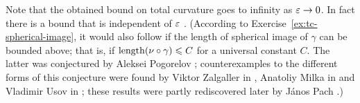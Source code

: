 Note that the obtained bound on total curvature goes to infinity as $\varepsilon\to 0$.
In fact there is a bound that is independent of $\varepsilon$ \cite{lebedeva-petrunin}.
(According to Exercise~\ref{ex:tc-spherical-image}, it would also follow if the length of spherical image of $\gamma$ can be bounded above; 
that is, if $\mathop{\rm length}\nolimits(\nu\circ\gamma)\leqslant C$ for a universal constant $C$.
The latter was conjectured by Aleksei Pogorelov \cite{pogorelov};
counterexamples to the different forms of this conjecture were found 
by Viktor Zalgaller in \cite{zalgaller},
Anatoliy Milka in \cite{milka}
and Vladimir Usov in \cite{usov};
these results were partly rediscovered later 
by J\'{a}nos Pach \cite{pach}.)
